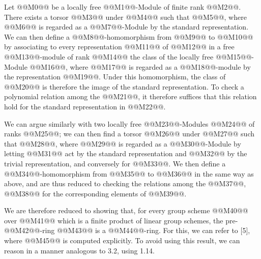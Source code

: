 Let @@M0@@ be a locally free @@M1@@-Module of finite rank @@M2@@. There exists a torsor @@M3@@ under @@M4@@ such that @@M5@@, where @@M6@@ is regarded as a @@M7@@-Module by the standard representation. We can then define a @@M8@@-homomorphism from @@M9@@ to @@M10@@ by associating to every representation @@M11@@ of @@M12@@ in a free @@M13@@-module of rank @@M14@@ the class of the locally free @@M15@@-Module
@@M16@@, where @@M17@@ is regarded as a @@M18@@-module by the representation @@M19@@. Under this homomorphism, the class of @@M20@@ is therefore the image of the standard representation. To check a polynomial relation among the @@M21@@, it therefore suffices that this relation hold for the standard representation in @@M22@@.

We can argue similarly with two locally free @@M23@@-Modules @@M24@@ of ranks @@M25@@; we can then find a torsor @@M26@@ under @@M27@@ such that @@M28@@, where @@M29@@ is regarded as a @@M30@@-Module by letting @@M31@@ act by the standard representation and @@M32@@ by the trivial representation, and conversely for @@M33@@. We then define a @@M34@@-homomorphism from @@M35@@ to @@M36@@ in the same way as above, and are thus reduced to checking the relations among the @@M37@@, @@M38@@ for the corresponding elements of @@M39@@.

We are therefore reduced to showing that, for every group scheme @@M40@@ over @@M41@@ which is a finite product of linear group schemes, the pre-@@M42@@-ring @@M43@@ is a @@M44@@-ring. For this, we can refer to [5], where @@M45@@ is computed explicitly. To avoid using this result, we can reason in a manner analogous to 3.2, using 1.14.

